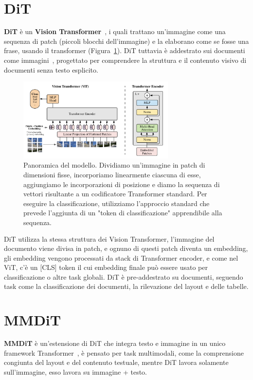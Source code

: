 \section{DiT}
\textbf{DiT} è un \textbf{Vision Transformer}~\cite{dosovitskiy2021vit}, i quali trattano un'immagine come una sequenza di patch (piccoli blocchi dell'immagine) e la elaborano come se fosse una frase, usando il transformer (Figura~\ref{fig:ViT}). DiT tuttavia è addestrato sui documenti come immagini~\cite{li2023dit}, progettato per comprendere la struttura e il contenuto visivo di documenti senza testo esplicito.
\begin{figure}
    \centering
    \includegraphics[width=0.7\textwidth]{figure/VisionTransformer}
    \caption{Panoramica del modello. Dividiamo un'immagine in patch di dimensioni fisse, incorporiamo linearmente ciascuna di esse, aggiungiamo le incorporazioni di posizione e diamo la sequenza di vettori risultante a un codificatore Transformer standard. Per eseguire la classificazione, utilizziamo l'approccio standard che prevede l'aggiunta di un "token di classificazione" apprendibile alla sequenza.}
    \label{fig:ViT}
\end{figure}
DiT utilizza la stessa struttura dei Vision Transformer, l'immagine del documento viene divisa in patch, e ognuno di questi patch diventa un embedding, gli embedding vengono processati da stack di Transformer encoder, e come nel ViT, c'è un [CLS] token il cui embedding finale può essere usato per classificazione o altre task globali. DiT è pre-addestrato su documenti, seguendo task come la classificazione dei documenti, la rilevazione del layout e delle tabelle.
\section{MMDiT}

\textbf{MMDiT} è un'estensione di DiT che integra testo e immagine in un unico framework Transformer~\cite{zhang2023mmdetdit}, è pensato per task multimodali, come la comprensione congiunta del layout e del contenuto testuale, mentre DiT lavora solamente sull'immagine, esso lavora su immagine + testo.


